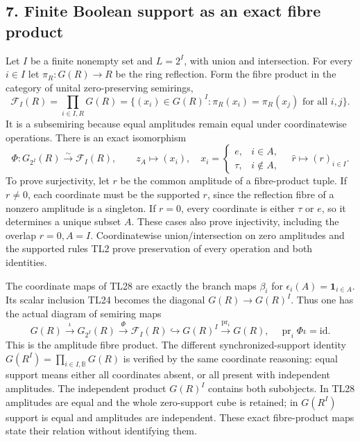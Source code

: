\documentclass[11pt,a4paper]{article}
\theoremstyle{definition}\newtheorem{definition}[theorem]{Definition}
\begin{document}
\subsection{7. Finite Boolean support as an exact fibre
product}\label{finite-boolean-support-as-an-exact-fibre-product}

Let \(I\) be a finite nonempty set and \(L=2^I\), with union and
intersection. For every \(i\in I\) let \(\pi_R:G(R)\to R\) be the ring
reflection. Form the fibre product in the category of unital
zero-preserving semirings, \[
 \mathcal F_I(R)=\prod_{i\in I,R}G(R)
 =\{(x_i)\in G(R)^I:\pi_R(x_i)=\pi_R(x_j)\text{ for all }i,j\}.
 \tag{TL27}
\] It is a subsemiring because equal amplitudes remain equal under
coordinatewise operations. There is an exact isomorphism \[
 \boxed{\Phi:G_{2^I}(R)\xrightarrow{\sim}\mathcal F_I(R),\qquad
 z_A\mapsto(x_i),\quad x_i=
 \begin{cases}e,&i\in A,\\\tau,&i\notin A,\end{cases}
 \quad\widehat r\mapsto(r)_{i\in I}.}
 \tag{TL28}
\] To prove surjectivity, let \(r\) be the common amplitude of a
fibre-product tuple. If \(r\ne0\), each coordinate must be the supported
\(r\), since the reflection fibre of a nonzero amplitude is a singleton.
If \(r=0\), every coordinate is either \(\tau\) or \(e\), so it
determines a unique subset \(A\). These cases also prove injectivity,
including the overlap \(r=0,A=I\). Coordinatewise union/intersection on
zero amplitudes and the supported rules TL2 prove preservation of every
operation and both identities.

The coordinate maps of TL28 are exactly the branch maps \(\beta_i\) for
\(\epsilon_i(A)=\mathbf1_{i\in A}\). Its scalar inclusion TL24 becomes
the diagonal \(G(R)\to G(R)^I\). Thus one has the actual diagram of
semiring maps \[
 G(R)\xrightarrow{\iota}G_{2^I}(R)
 \xrightarrow{\Phi}\mathcal F_I(R)\hookrightarrow G(R)^I
 \xrightarrow{\operatorname{pr}_i}G(R),
 \quad\operatorname{pr}_i\Phi\iota=\mathrm{id}.
 \tag{TL29}
\] This is the amplitude fibre product. The different
synchronized-support identity \(G(R^I)=\prod_{i\in I,\mathbb B}G(R)\) is
verified by the same coordinate reasoning: equal support means either
all coordinates absent, or all present with independent amplitudes. The
independent product \(G(R)^I\) contains both subobjects. In TL28
amplitudes are equal and the whole zero-support cube is retained; in
\(G(R^I)\) support is equal and amplitudes are independent. These exact
fibre-product maps state their relation without identifying them.
\end{document}
